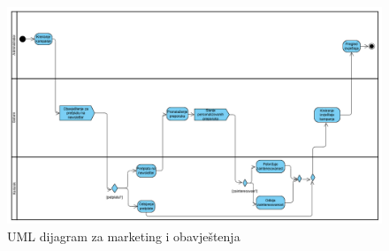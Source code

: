 \begin{figure}[H]
        \centering
        \includegraphics[width=1\linewidth]{Slike/FZ7.png}
        \caption{UML dijagram za marketing i obavještenja}
        \label{fig:fz7}
    \end{figure}
\sloppy  
